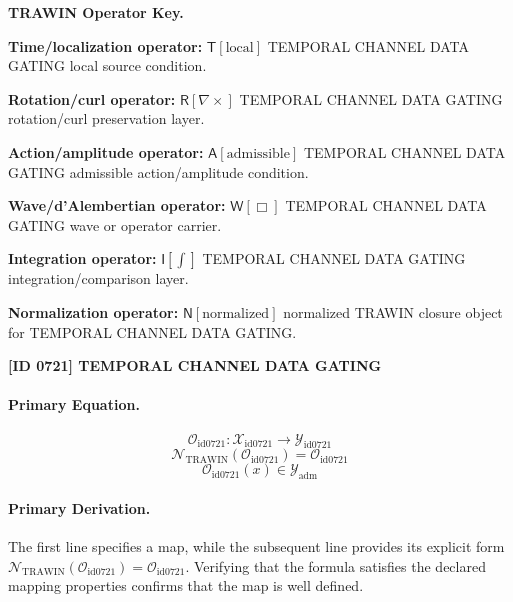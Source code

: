 \par\vspace{0.45\baselineskip}
\noindent\begin{minipage}[t]{\linewidth}
\begingroup
\small
\raggedright
\textbf{TRAWIN Operator Key.}\par
\noindent\textbf{Time/localization operator:} $\mathsf{T}\!\left[\mathrm{local}\right]$ TEMPORAL CHANNEL DATA GATING local source condition.\par
\noindent\textbf{Rotation/curl operator:} $\mathsf{R}\!\left[\nabla\times\right]$ TEMPORAL CHANNEL DATA GATING rotation/curl preservation layer.\par
\noindent\textbf{Action/amplitude operator:} $\mathsf{A}\!\left[\mathrm{admissible}\right]$ TEMPORAL CHANNEL DATA GATING admissible action/amplitude condition.\par
\noindent\textbf{Wave/d'Alembertian operator:} $\mathsf{W}\!\left[\Box\right]$ TEMPORAL CHANNEL DATA GATING wave or operator carrier.\par
\noindent\textbf{Integration operator:} $\mathsf{I}\!\left[\int\right]$ TEMPORAL CHANNEL DATA GATING integration/comparison layer.\par
\noindent\textbf{Normalization operator:} $\mathsf{N}\!\left[\mathrm{normalized}\right]$ normalized TRAWIN closure object for TEMPORAL CHANNEL DATA GATING.\par
\endgroup
\end{minipage}

\clearpage
\noindent\textbf{[ID 0721] TEMPORAL CHANNEL DATA GATING}\par
\vspace{0.35em}
\paragraph{Primary Equation.}
\[
\mathcal{O}_{\mathrm{id0721}}:\mathcal{X}_{\mathrm{id0721}}\longrightarrow\mathcal{Y}_{\mathrm{id0721}}
\]
\[
\mathcal{N}_{\mathrm{TRAWIN}}(\mathcal{O}_{\mathrm{id0721}})=\mathcal{O}_{\mathrm{id0721}}
\]
\[
\mathcal{O}_{\mathrm{id0721}}(x)\in\mathcal{Y}_{\mathrm{adm}}
\]

\paragraph{Primary Derivation.}
The first line specifies a map, while the subsequent line provides its explicit form \( \mathcal{N}_{\mathrm{TRAWIN}}(\mathcal{O}_{\mathrm{id0721}})=\mathcal{O}_{\mathrm{id0721}} \). Verifying that the formula satisfies the declared mapping properties confirms that the map is well defined.

